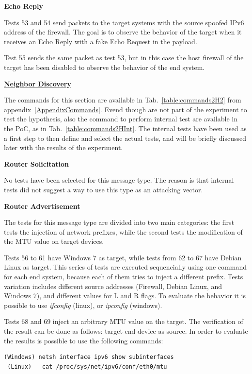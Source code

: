 \documentclass[12pt]{article}
\begin{document}
\textbf{Echo Reply}

Tests 53 and 54 send packets to the target systems with the source spoofed IPv6 address of the firewall. The goal is to observe the behavior of the target when it receives an Echo Reply with a fake Echo Request in the payload.

Test 55 sends the same packet as test 53, but in this case the host firewall of the target has been disabled to observe the behavior of the end system.


\textbf{\underline{Neighbor Discovery}}

The commands for this section are available in Tab.~\ref{table:commands2H2} from appendix~\ref{AppendixCommands}. Evend though are not part of the experiment to test the hypothesis, also the command to perform internal test are available in the PoC, as in Tab.~\ref{table:commands2HInt}. The internal tests have been used as a first step to then define and select the actual tests, and will be briefly discussed later with the results of the experiment.

\textbf{Router Solicitation}

No tests have been selected for this message type. The reason is that internal tests did not suggest a way to use this type as an attacking vector.

\textbf{Router Advertisement}

The tests for this message type are divided into two main categories: the first tests the injection of network prefixes, while the second tests the modification of the MTU value on target devices. 

Tests 56 to 61 have Windows 7 as target, while tests from 62 to 67 have Debian Linux as target. This series of tests are executed sequencially using one command for each end system, because each of them tries to inject a different prefix. Tests variation includes different source addresses (Firewall, Debian Linux, and Windows 7), and different values for L and R flags. To evaluate the behavior it is possible to use \textit{ifconfig} (linux), or \textit{ipconfig} (windows).

Tests 68 and 69 inject an arbitrary MTU value on the target. The verification of the result can be done as follows:
target end device as source. In order to evaluate the results is possible to use the following commands:
\begin{lstlisting}[style=python,basicstyle=\ttfamily\small]
 (Windows) netsh interface ipv6 show subinterfaces
 (Linux)   cat /proc/sys/net/ipv6/conf/eth0/mtu
\end{lstlisting}
\end{document}
